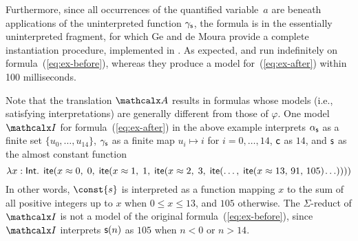\begin{example}
Furthermore, since all occurrences of the quantified variable~$a$ are
beneath applications of the uninterpreted function $\gamma_{\mathsf{s}}$,
the formula is in the essentially uninterpreted fragment,
for which Ge and de Moura \cite{GeDeM-CAV-09} provide
a complete instantiation procedure, implemented in \ziii.
As expected,
\cvc and \ziii run indefinitely on formula~(\ref{eq:ex-before}),
whereas they produce a model for~(\ref{eq:ex-after})
within 100 milliseconds.\xend
\end{example}

\newcommand\badlambda{\lambda x : \typeint.\allowbreak\;\, \lite( x \teq 0,\allowbreak\; 0,\allowbreak\;
  \lite( x \teq 1,\allowbreak\; 1,\allowbreak\;
    \lite( x \teq 2,\allowbreak\; 3,\allowbreak\;
      \lite(\ldots,\allowbreak\; \lite( x \teq 13,\allowbreak\, 91,\allowbreak\, 105 )\negvthinspace \ldots ))))}

Note that the translation $\conv$ results in formulas whose models
(i.e., satisfying interpretations) are generally different from those of $\varphi$.
One model $\I$ for formula~(\ref{eq:ex-after}) in the above example interprets
$\alpha_{\mathsf{s}}$ as a finite set $\{ u_0, \ldots, u_{14} \}$,
$\gamma_{\mathsf{s}}$ as a finite map $u_i \mapsto i$ for $i = 0, \ldots, 14$,
$\mathsf{c}$ as $14$,
and $\mathsf{s}$ as the almost constant function
%
\[\badlambda\]
%
In other words, $\const{s}$ is interpreted as a function mapping $x$ to the sum
of all positive integers up to $x$ when $0 \leq x \leq 13$, and $105$
otherwise.
The $\Sigma$-reduct of $\I$ is not a model of the original formula~(\ref{eq:ex-before}),
since $\I$
interprets $\mathsf{s}( n )$ as $105$ when $n < 0$ or $n > 14$.

